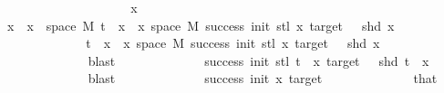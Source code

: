 \begin{isabellebody}
\ \ \ \ \ \ \ \ \isamarkupfalse%
\isanewline
\ \ \ \ \ \ \ \ \ \ \isamarkupfalse%
\ x\isanewline
\ \ \ \ \ \ \ \ \ \ \isamarkupfalse%
\ {\isachardoublequoteopen}x\ {\isasymin}\ {\isacharbraceleft}{\kern0pt}x\ {\isasymin}\ space\ M{\isachardot}{\kern0pt}\ {\isacharparenleft}{\kern0pt}t\ {\isacharhash}{\kern0pt}{\isacharhash}{\kern0pt}\ x{\isacharparenright}{\kern0pt}\ {\isasymin}\ {\isacharbraceleft}{\kern0pt}x{\isasymin}\ space\ M{\isachardot}{\kern0pt}\ success\ {\isacharparenleft}{\kern0pt}init{\isacharminus}{\kern0pt}{}{\isacharparenright}{\kern0pt}\ {\isacharparenleft}{\kern0pt}stl\ x{\isacharparenright}{\kern0pt}\ target\ {\isasymand}\ {\isasymnot}\ shd\ x{\isacharbraceright}{\kern0pt}{\isacharbraceright}{\kern0pt}\ {\isachardoublequoteclose}\isanewline
\ \ \ \ \ \ \ \ \ \ \isamarkupfalse%
\ \isamarkupfalse%
\ {\isachardoublequoteopen}{\isacharparenleft}{\kern0pt}t\ {\isacharhash}{\kern0pt}{\isacharhash}{\kern0pt}\ x{\isacharparenright}{\kern0pt}\ {\isasymin}\ {\isacharbraceleft}{\kern0pt}x{\isasymin}\ space\ M{\isachardot}{\kern0pt}\ success\ {\isacharparenleft}{\kern0pt}init{\isacharminus}{\kern0pt}{}{\isacharparenright}{\kern0pt}\ {\isacharparenleft}{\kern0pt}stl\ x{\isacharparenright}{\kern0pt}\ target\ {\isasymand}\ {\isasymnot}\ shd\ x{\isacharbraceright}{\kern0pt}{\isachardoublequoteclose}\isanewline
\ \ \ \ \ \ \ \ \ \ \ \ \isamarkupfalse%
\ blast\isanewline
\ \ \ \ \ \ \ \ \ \ \isamarkupfalse%
\ \isamarkupfalse%
\ {\isachardoublequoteopen}success\ {\isacharparenleft}{\kern0pt}init{\isacharminus}{\kern0pt}{}{\isacharparenright}{\kern0pt}\ {\isacharparenleft}{\kern0pt}stl\ {\isacharparenleft}{\kern0pt}t\ {\isacharhash}{\kern0pt}{\isacharhash}{\kern0pt}\ x{\isacharparenright}{\kern0pt}{\isacharparenright}{\kern0pt}\ target\ {\isasymand}\ {\isasymnot}\ shd\ {\isacharparenleft}{\kern0pt}t\ {\isacharhash}{\kern0pt}{\isacharhash}{\kern0pt}\ x{\isacharparenright}{\kern0pt}{\isachardoublequoteclose}\isanewline
\ \ \ \ \ \ \ \ \ \ \ \ \isamarkupfalse%
\ blast\isanewline
\ \ \ \ \ \ \ \ \ \ \isamarkupfalse%
\ \isamarkupfalse%
\ {\isachardoublequoteopen}success\ {\isacharparenleft}{\kern0pt}init{\isacharminus}{\kern0pt}{}{\isacharparenright}{\kern0pt}\ {\isacharparenleft}{\kern0pt}x{\isacharparenright}{\kern0pt}\ target{\isachardoublequoteclose}\isanewline
\ \ \ \ \ \ \ \ \ \ \ \ \isamarkupfalse%
\ that\isanewline

\end{isabellebody}
